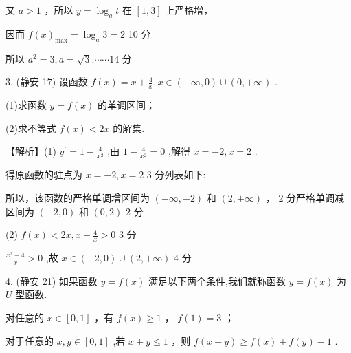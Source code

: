 \documentclass[10pt]{article}
\newcommand*\circled[1]{\tikz[baseline=(char.base)]{\node[shape=circle,draw,inner sep=1.5pt] (char) {\small #1};}}
\begin{document}
又 \(a > 1\) ，所以 \(y = {\log }_{a}t\) 在 \(\left\lbrack  {1,3}\right\rbrack\) 上严格增，

因而 \(f{\left( x\right) }_{\max } = {\log }_{a}3 = 2\) 10 分

所以 \({a}^{2} = 3,a = \sqrt{3}.\cdots \cdots {14}\) 分

3. (静安 17) 设函数 \(f\left( x\right)  = x + \frac{4}{x},x \in  \left( {-\infty ,0}\right)  \cup  \left( {0, + \infty }\right)\) .

(1)求函数 \(y = f\left( x\right)\) 的单调区间；

(2)求不等式 \(f\left( x\right)  < {2x}\) 的解集.

【解析】(1) \({y}^{\prime } = 1 - \frac{4}{{x}^{2}}\) ,由 \(1 - \frac{4}{{x}^{2}} = 0\) ,解得 \(x =  - 2,x = 2\) .

得原函数的驻点为 \(x =  - 2,x = 2\) 3 分列表如下:

\begin{center}
\end{center}

所以，该函数的严格单调增区间为 \(\left( {-\infty , - 2}\right)\) 和 \(\left( {2, + \infty }\right)\) ， 2 分严格单调减区间为 \(\left( {-2,0}\right)\) 和 \(\left( {0,2}\right)\) 2 分

(2) \(f\left( x\right)  < {2x},x - \frac{4}{x} > 0\) 3 分

\(\frac{{x}^{2} - 4}{x} > 0\) ,故 \(x \in  \left( {-2,0}\right)  \cup  \left( {2, + \infty }\right)\) 4 分

4. (静安 21) 如果函数 \(y = f\left( x\right)\) 满足以下两个条件,我们就称函数 \(y = f\left( x\right)\) 为 \(U\) 型函数.

 \circled{1} 对任意的 \(x \in  \left\lbrack  {0,1}\right\rbrack\) ，有 \(f\left( x\right)  \geq  1\) ， \(f\left( 1\right)  = 3\) ；

 \circled{2} 对于任意的 \(x,y \in  \left\lbrack  {0,1}\right\rbrack\) ,若 \(x + y \leq  1\) ，则 \(f\left( {x + y}\right)  \geq  f\left( x\right)  + f\left( y\right)  - 1\) .
\end{document}
